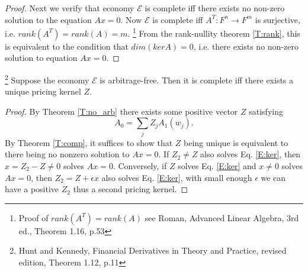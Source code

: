 \begin{proof}


Next we verify that economy $\mathcal{E}$ is complete iff there exists no 
non-zero solution to the equation $Ax=0$. Now $\mathcal{E}$ is complete iff
$A^T:F^n\to F^m$ is surjective, i.e. $rank(A^T)=rank(A)=m$. 
\footnote{Proof of $rank(A^T)=rank(A)$ see Roman, Advanced Linear Algebra, 
          3rd ed., Theorem 1.16, p.53}
From the rank-nullity theorem \ref{T:rank}, this is equivalent to the condition
that $dim(ker A)=0$, i.e. there exists no non-zero solution to equation
$Ax=0$.
\end{proof}


\begin{theorem} \label{T:comp2}
\footnote{Hunt and Kennedy, Financial Derivatives in Theory and Practice, 
    revised edition, Theorem 1.12, p.11}
Suppose the economy $\mathcal{E}$ is arbitrage-free. Then it is complete iff 
there exists a unique pricing kernel $Z$.
\end{theorem}
\begin{proof}
By Theorem \ref{T:no_arb} there exists some positive vector $Z$ satisfying
\begin{equation} \label{E:ker}
  A_0 = \sum_j Z_j A_1(w_j).
\end{equation}
By Theorem \ref{T:comp}, it suffices to show that $Z$ being unique is equivalent
to there being no nonzero solution to $A x=0$. If $Z_2\neq Z$ also solves
Eq. \ref{E:ker}, then $x=Z_2-Z\neq 0$ solves $Ax=0$. Conversely, if $Z$ solves
Eq. \ref{E:ker} and $x\neq 0$ solves $A x=0$, then $Z_2=Z+\epsilon x$ also solves
Eq. \ref{E:ker}, with small enough $\epsilon$ we can have a positive $Z_2$ thus a
second pricing kernel.
\end{proof}



